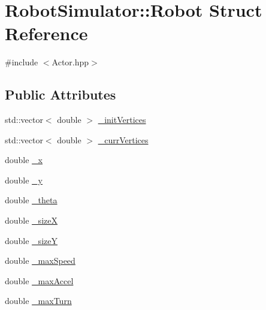 \hypertarget{structRobotSimulator_1_1Robot}{\section{Robot\-Simulator\-:\-:Robot Struct Reference}
\label{structRobotSimulator_1_1Robot}
}


{\ttfamily \#include $<$Actor.\-hpp$>$}

\subsection*{Public Attributes}
\begin{DoxyCompactItemize}
\item 
std\-::vector$<$ double $>$ \hyperlink{structRobotSimulator_1_1Robot_ab7ac2c4dd487006e5e563ad0341808fb}{\-\_\-init\-Vertices}
\item 
std\-::vector$<$ double $>$ \hyperlink{structRobotSimulator_1_1Robot_acc4b3b442e3739589a5b7a3597988df2}{\-\_\-curr\-Vertices}
\item 
double \hyperlink{structRobotSimulator_1_1Robot_ab86590932e31a8a7aad72e0173b8c0e8}{\-\_\-x}
\item 
double \hyperlink{structRobotSimulator_1_1Robot_a0b386e0cb1fcdbb0ed0fd0a42d362165}{\-\_\-y}
\item 
double \hyperlink{structRobotSimulator_1_1Robot_a9c91ff0ff4514da0c9cd56f45064032e}{\-\_\-theta}
\item 
double \hyperlink{structRobotSimulator_1_1Robot_afc7eddc29b81662393361dc8ca24806a}{\-\_\-size\-X}
\item 
double \hyperlink{structRobotSimulator_1_1Robot_a15d2779576df86d973c42c12c1f3c2ba}{\-\_\-size\-Y}
\item 
double \hyperlink{structRobotSimulator_1_1Robot_a25f9d011ee0c6952950b63405286438b}{\-\_\-max\-Speed}
\item 
double \hyperlink{structRobotSimulator_1_1Robot_a34048992e382edb88e15cbee3741e7ed}{\-\_\-max\-Accel}
\item 
double \hyperlink{structRobotSimulator_1_1Robot_af9967fd4b2e74e67e5b9d3bc45fd30d3}{\-\_\-max\-Turn}
\end{DoxyCompactItemize}


